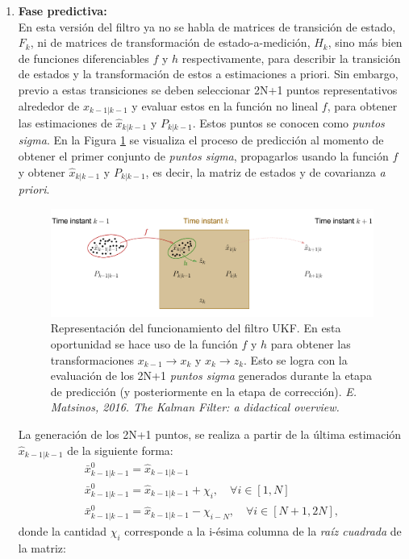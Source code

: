 \begin{enumerate}
\item \textbf{Fase predictiva:}\\
En esta versi\'on del filtro \cite{ukf} ya no se habla de matrices de transici\'on de estado, $F_k$, ni de matrices de transformaci\'on de estado-a-medici\'on, $H_k$, sino m\'as bien de funciones diferenciables $f$ y $h$ respectivamente, para describir la transici\'on de estados  y la transformaci\'on de estos a estimaciones a priori. Sin embargo, previo a estas transiciones se deben seleccionar 2N+1 puntos representativos alrededor de $\hat{x}_{k-1|k-1}$ y evaluar estos en la funci\'on no lineal $f$, para obtener las estimaciones de $\hat{x}_{k|k-1}$ y $P_{k|k-1}$. Estos puntos se conocen como \textit{puntos sigma}. En la Figura \ref{fig:fukf} se visualiza el proceso de predicci\'on al momento de obtener el primer conjunto de \textit{puntos sigma}, propagarlos usando la funci\'on $f$ y obtener $\hat{x}_{k|k-1}$ y $P_{k|k-1}$, es decir, la matriz de estados y de covarianza \textit{a priori}. 

\begin{figure}[h!]
\includegraphics[scale=.5]{images/ukf}
\caption{Representaci\'on del funcionamiento del filtro UKF. En esta oportunidad se hace uso de la funci\'on $f$ y $h$ para obtener las transformaciones $x_{k-1}\rightarrow x_k$ y $x_{k}\rightarrow z_k$. Esto se logra con la evaluaci\'on de los 2N+1 \textit{puntos sigma} generados durante la etapa de predicci\'on (y posteriormente en la etapa de correcci\'on). \textit{E. Matsinos, 2016. The Kalman Filter: a didactical overview.}}
\label{fig:fukf} 
\end{figure}

La generaci\'on de los 2N+1 puntos, se realiza a partir de la \'ultima estimaci\'on $\hat{x}_{k-1|k-1}$  de la siguiente forma:
\begin{equation}
\label{eq:eq18}
\begin{gathered}
\bar{x}_{k-1| k-1}^0 = \hat{x}_{k-1|k-1}\\
\bar{x}_{k-1| k-1}^0 = \hat{x}_{k-1|k-1}+ \chi_i, \quad  \forall i \in [1, N]\\
\bar{x}_{k-1| k-1}^0 = \hat{x}_{k-1|k-1}- \chi_{i-N}, \quad  \forall i \in [N+1, 2N],
\end{gathered}
\end{equation}
donde la cantidad $\chi_i$ corresponde a la i-\'esima columna de la \textit{ra\'iz cuadrada} de la matriz:


\end{enumerate}
